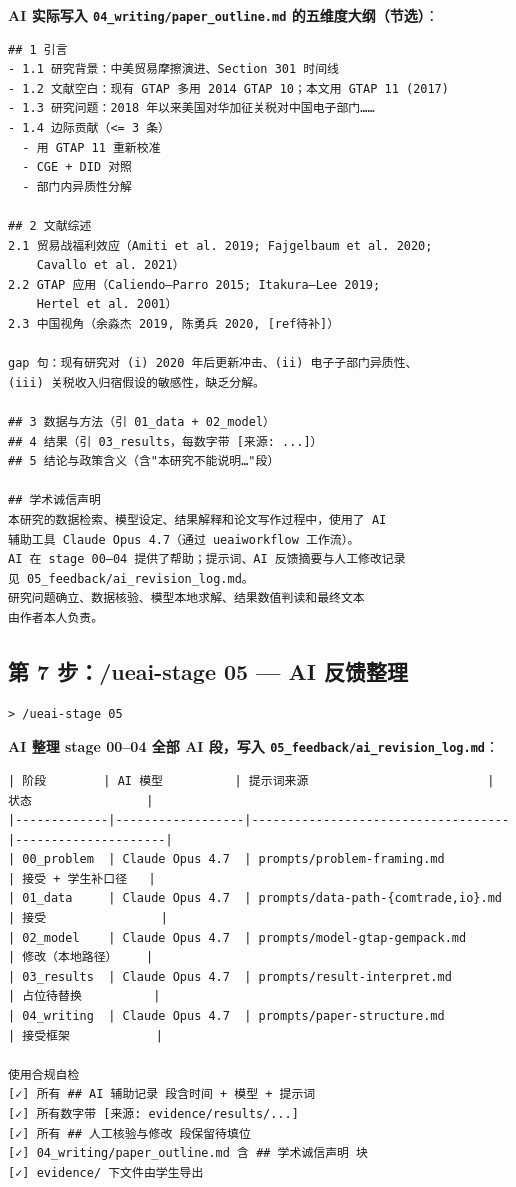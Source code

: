 \documentclass[12pt,a4paper]{article}
\begin{document}
\noindent\textbf{AI 实际写入 \texttt{04\_writing/paper\_outline.md} 的五维度大纲（节选）}：
\begin{lstlisting}[style=md]
## 1 引言
- 1.1 研究背景：中美贸易摩擦演进、Section 301 时间线
- 1.2 文献空白：现有 GTAP 多用 2014 GTAP 10；本文用 GTAP 11 (2017)
- 1.3 研究问题：2018 年以来美国对华加征关税对中国电子部门……
- 1.4 边际贡献（<= 3 条）
  - 用 GTAP 11 重新校准
  - CGE + DID 对照
  - 部门内异质性分解

## 2 文献综述
2.1 贸易战福利效应（Amiti et al. 2019; Fajgelbaum et al. 2020;
    Cavallo et al. 2021）
2.2 GTAP 应用（Caliendo–Parro 2015; Itakura–Lee 2019;
    Hertel et al. 2001）
2.3 中国视角（余淼杰 2019, 陈勇兵 2020, [ref待补]）

gap 句：现有研究对 (i) 2020 年后更新冲击、(ii) 电子子部门异质性、
(iii) 关税收入归宿假设的敏感性，缺乏分解。

## 3 数据与方法（引 01_data + 02_model）
## 4 结果（引 03_results，每数字带 [来源: ...]）
## 5 结论与政策含义（含"本研究不能说明…"段）

## 学术诚信声明
本研究的数据检索、模型设定、结果解释和论文写作过程中，使用了 AI
辅助工具 Claude Opus 4.7（通过 ueaiworkflow 工作流）。
AI 在 stage 00–04 提供了帮助；提示词、AI 反馈摘要与人工修改记录
见 05_feedback/ai_revision_log.md。
研究问题确立、数据核验、模型本地求解、结果数值判读和最终文本
由作者本人负责。
\end{lstlisting}

\subsection{第 7 步：/ueai-stage 05 — AI 反馈整理}

\begin{lstlisting}[style=prompt]
> /ueai-stage 05
\end{lstlisting}

\noindent\textbf{AI 整理 stage 00–04 全部 AI 段，写入 \texttt{05\_feedback/ai\_revision\_log.md}}：
\begin{lstlisting}[style=md]
| 阶段        | AI 模型          | 提示词来源                         | 状态                |
|-------------|------------------|------------------------------------|---------------------|
| 00_problem  | Claude Opus 4.7  | prompts/problem-framing.md         | 接受 + 学生补口径   |
| 01_data     | Claude Opus 4.7  | prompts/data-path-{comtrade,io}.md | 接受                |
| 02_model    | Claude Opus 4.7  | prompts/model-gtap-gempack.md      | 修改（本地路径）    |
| 03_results  | Claude Opus 4.7  | prompts/result-interpret.md        | 占位待替换          |
| 04_writing  | Claude Opus 4.7  | prompts/paper-structure.md         | 接受框架            |

使用合规自检
[✓] 所有 ## AI 辅助记录 段含时间 + 模型 + 提示词
[✓] 所有数字带 [来源: evidence/results/...]
[✓] 所有 ## 人工核验与修改 段保留待填位
[✓] 04_writing/paper_outline.md 含 ## 学术诚信声明 块
[✓] evidence/ 下文件由学生导出
\end{lstlisting}
\end{document}
